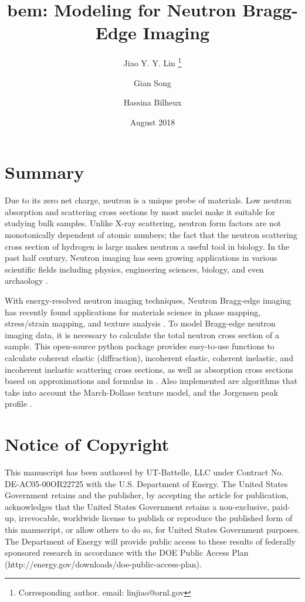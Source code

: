 \documentclass{article}
\title{bem: Modeling for Neutron Bragg-Edge Imaging}
\author[1]{Jiao Y. Y. Lin \thanks{Corresponding author. email: linjiao@ornl.gov}}
\author[1]{Gian Song}
\author[1]{Hassina Bilheux}
\affil[1]{Neutron Scattering Division, Oak Ridge National Lab}
\date{August 2018}
\begin{document}
\maketitle

\section{Summary}\label{summary}
Due to its zero net charge, neutron is a unique probe of materials.
Low neutron absorption and scattering cross sections by most nuclei make it
suitable for studying bulk samples.
Unlike X-ray scattering, neutron form factors are not monotonically dependent of atomic numbers;
the fact that the neutron scattering cross section of hydrogen is large makes neutron
a useful tool in biology.
In the past half century, Neutron imaging has seen growing applications
in various scientific fields
including physics, engineering sciences, biology, and even archaology
\cite{strobl2009}.

With energy-resolved neutron imaging techniques,
Neutron Bragg-edge imaging has recently found applications for materials science in phase mapping,
stress/strain mapping, and texture analysis
\cite{lehmann2010, sato2017}.
To model Bragg-edge neutron imaging data, it is necessary to calculate
the total neutron cross section of a sample.
This open-source python package
provides easy-to-use functions to calculate coherent elastic (diffraction),
incoherent elastic, coherent inelastic, and incoherent inelastic scattering
cross sections, as well as absorption cross sections
based on approximations and formulas in \cite{vogel2000thesis}.
Also implemented are algorithms that take into account 
the March-Dollase texture model, and the Jorgensen peak profile
\cite{vogel2000thesis}.

\section{Notice of Copyright}\label{notice-of-copyright}

This manuscript has been authored by UT-Battelle, LLC under Contract No.
DE-AC05-00OR22725 with the U.S. Department of Energy. The United States
Government retains and the publisher, by accepting the article for
publication, acknowledges that the United States Government retains a
non-exclusive, paid-up, irrevocable, worldwide license to publish or
reproduce the published form of this manuscript, or allow others to do
so, for United States Government purposes. The Department of Energy will
provide public access to these results of federally sponsored research
in accordance with the DOE Public Access Plan
(http://energy.gov/downloads/doe-public-access-plan).
\end{document}
